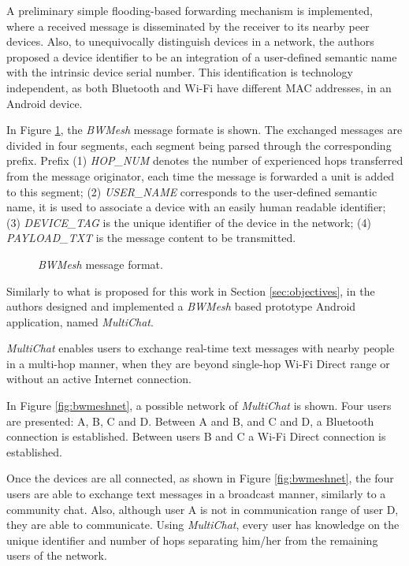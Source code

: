 A preliminary simple flooding-based forwarding mechanism is implemented, where a received message is disseminated by the receiver to its nearby peer devices. Also, to unequivocally distinguish devices in a network, the authors proposed a device identifier to be an integration of a user-defined semantic name with the intrinsic device serial number. This identification is technology independent, as both Bluetooth and Wi-Fi have different \gls{MAC} addresses, in an Android device.

In Figure \ref{fig:bwmsg}, the \textit{BWMesh} message formate is shown. The exchanged messages are divided in four segments, each segment being parsed through the corresponding prefix. Prefix (1) \textit{HOP\_NUM} denotes the number of experienced hops transferred from the message originator, each time the message is forwarded a unit is added to this segment; (2) \textit{USER\_NAME} corresponds to the user-defined semantic name, it is used to associate a device with an easily human readable identifier; (3) \textit{DEVICE\_TAG} is the unique identifier of the device in the network; (4) \textit{PAYLOAD\_TXT} is the message content to be transmitted.

\begin{figure}[ht]
	\noindent{}
	\caption{\label{fig:bwmsg} \textit{BWMesh} message format.}
\end{figure}

Similarly to what is proposed for this work in Section \ref{sec:objectives}, in \cite{bwmesh} the authors designed and implemented a \textit{BWMesh} based prototype Android application, named \textit{MultiChat}.

\textit{MultiChat} enables users to exchange real-time text messages with nearby people in a multi-hop manner, when they are beyond single-hop Wi-Fi Direct range or without an active Internet connection.

In Figure \ref{fig:bwmeshnet}, a possible network of \textit{MultiChat} is shown. Four users are presented: A, B, C and D. Between A and B, and C and D, a Bluetooth connection is established. Between users B and C a Wi-Fi Direct connection is established.

Once the devices are all connected, as shown in Figure \ref{fig:bwmeshnet}, the four users are able to exchange text messages in a broadcast manner, similarly to a community chat. Also, although user A is not in communication range of user D, they are able to communicate. Using \textit{MultiChat}, every user has knowledge on the unique identifier and number of hops separating him/her from the remaining users of the network.

